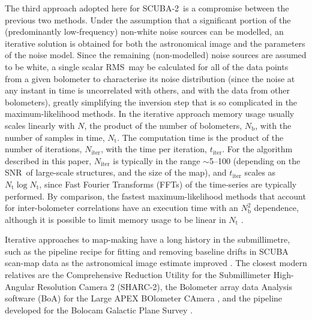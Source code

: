 \documentclass[useAMS,usenatbib,nofootinbib]{mn2e}
\newcommand{\snr}{SNR}
\newcommand{\scuba}{SCUBA-2}
\newcommand{\rms}{RMS}
\begin{document}
The third approach adopted here for \scuba\ is a compromise between
the previous two methods. Under the assumption that a significant
portion of the (predominantly low-frequency) non-white noise sources
can be modelled, an iterative solution is obtained for both the
astronomical image and the parameters of the noise model. Since the
remaining (non-modelled) noise sources are assumed to be white, a
single scalar \rms\ may be calculated for all of the data points from
a given bolometer to characterise its noise distribution (since the
noise at any instant in time is uncorrelated with others, and with the
data from other bolometers), greatly simplifying the inversion step
that is so complicated in the maximum-likelihood methods. In the
iterative approach memory usage usually scales linearly with $N$, the
product of the number of bolometers, $N_\mathrm{b}$, with the number
of samples in time, $N_\mathrm{t}$. The computation time is the
product of the number of iterations, $N_\mathrm{iter}$, with the time
per iteration, $t_\mathrm{iter}$. For the algorithm described in this
paper, $N_\mathrm{iter}$ is typically in the range $\sim$5--100
(depending on the \snr\ of large-scale structures, and the size of the
map), and $t_\mathrm{iter}$ scales as $N_\mathrm{t} \log
N_\mathrm{t}$, since Fast Fourier Transforms (FFTs) of the time-series
are typically performed. By comparison, the fastest maximum-likelihood
methods that account for inter-bolometer correlations have an
execution time with an $N_\mathrm{b}^2$ dependence, although it is
possible to limit memory usage to be linear in $N_\mathrm{t}$
\citep[e.g.,][]{patanchon2008}.

Iterative approaches to map-making have a long history in the
submillimetre, such as the pipeline recipe for fitting and removing
baseline drifts in SCUBA scan-map data as the astronomical image
estimate improved \citep{1999ASPC..172..171J}. The closest modern
relatives are the Comprehensive Reduction Utility
\citep[CRUSH,][]{kovacs2008} for the Submillimeter High-Angular
Resolution Camera 2 (SHARC-2), the Bolometer array data Analysis
software (BoA) for the Large APEX BOlometer CAmera
\citep[LABOCA,][]{siringo2009}, and the pipeline developed for the
Bolocam Galactic Plane Survey \citep{aguirre2011}.
\end{document}
